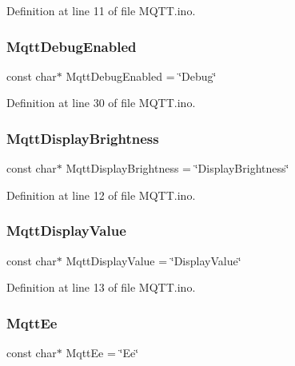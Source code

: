 Definition at line 11 of file M\+Q\+T\+T.\+ino.

\mbox{\label{_m_q_t_t_8ino_a9dd527bc8f7b6aa91ec01a19ada280b2}} 
\subsubsection{\texorpdfstring{MqttDebugEnabled}{MqttDebugEnabled}}
{\footnotesize\ttfamily const char$\ast$ Mqtt\+Debug\+Enabled = \char`\"{}Debug\char`\"{}}



Definition at line 30 of file M\+Q\+T\+T.\+ino.

\mbox{\label{_m_q_t_t_8ino_a798f1d6dbe160e92c1bec131a99f9a73}} 
\subsubsection{\texorpdfstring{MqttDisplayBrightness}{MqttDisplayBrightness}}
{\footnotesize\ttfamily const char$\ast$ Mqtt\+Display\+Brightness = \char`\"{}Display\+Brightness\char`\"{}}



Definition at line 12 of file M\+Q\+T\+T.\+ino.

\mbox{\label{_m_q_t_t_8ino_ae6d68e2f352746baea76bb4213c81638}} 
\subsubsection{\texorpdfstring{MqttDisplayValue}{MqttDisplayValue}}
{\footnotesize\ttfamily const char$\ast$ Mqtt\+Display\+Value = \char`\"{}Display\+Value\char`\"{}}



Definition at line 13 of file M\+Q\+T\+T.\+ino.

\mbox{\label{_m_q_t_t_8ino_ac32ae5db7c1567f25f76a9d7dc5ec11b}} 
\subsubsection{\texorpdfstring{MqttEe}{MqttEe}}
{\footnotesize\ttfamily const char$\ast$ Mqtt\+Ee = \char`\"{}Ee\char`\"{}}




